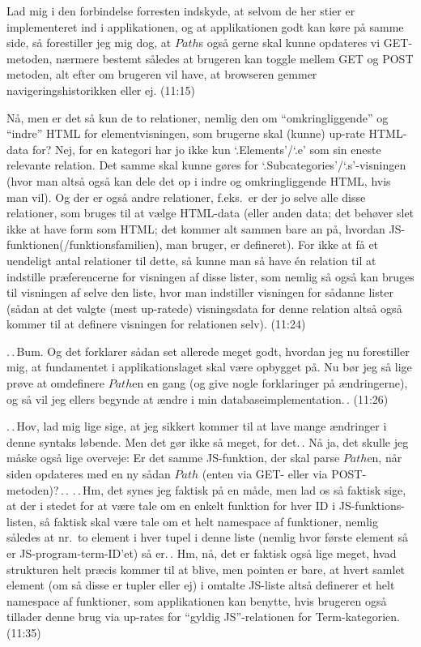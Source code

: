 \documentclass{report}
\begin{document}
Lad mig i den forbindelse forresten indskyde, at selvom de her stier er implementeret ind i applikationen, og at applikationen godt kan køre på samme side, så forestiller jeg mig dog, at $Path$s også gerne skal kunne opdateres vi GET-metoden, nærmere bestemt således at brugeren kan toggle mellem GET og POST metoden, alt efter om brugeren vil have, at browseren gemmer navigeringshistorikken eller ej. (11:15)

Nå, men er det så kun de to relationer, nemlig den om ``omkringliggende'' og ``indre'' HTML for elementvisningen, som brugerne skal (kunne) up-rate HTML-data for? Nej, for en kategori har jo ikke kun `.Elements'/`.e' som sin eneste relevante relation. Det samme skal kunne gøres for `.Subcategories'/`.s'-visningen (hvor man altså også kan dele det op i indre og omkringliggende HTML, hvis man vil). Og der er også andre relationer, f.eks.\ er der jo selve alle disse relationer, som bruges til at vælge HTML-data (eller anden data; det behøver slet ikke at have form som HTML; det kommer alt sammen bare an på, hvordan JS-funktionen(/funktionsfamilien), man bruger, er defineret). For ikke at få et uendeligt antal relationer til dette, så kunne man så have én relation til at indstille præferencerne for visningen af disse lister, som nemlig så også kan bruges til visningen af selve den liste, hvor man indstiller visningen for sådanne lister (sådan at det valgte (mest up-ratede) visningsdata for denne relation altså også kommer til at definere visningen for relationen selv). (11:24) 

.\,.\,Bum. Og det forklarer sådan set allerede meget godt, hvordan jeg nu forestiller mig, at fundamentet i applikationslaget skal være opbygget på. Nu bør jeg så lige prøve at omdefinere $Path$en en gang (og give nogle forklaringer på ændringerne), og så vil jeg ellers begynde at ændre i min databaseimplementation.\,. (11:26)

.\,.\,Hov, lad mig lige sige, at jeg sikkert kommer til at lave mange ændringer i denne syntaks løbende. Men det gør ikke så meget, for det.\,. Nå ja, det skulle jeg måske også lige overveje: Er det samme JS-funktion, der skal parse $Path$en, når siden opdateres med en ny sådan $Path$ (enten via GET- eller via POST-metoden)?\,.\,. .\,.\,Hm, det synes jeg faktisk på en måde, men lad os så faktisk sige, at der i stedet for at være tale om en enkelt funktion for hver ID i JS-funktions-listen, så faktisk skal være tale om et helt namespace af funktioner, nemlig således at nr.\ to element i hver tupel i denne liste (nemlig hvor første element så er JS-program-term-ID'et) så er.\,. Hm, nå, det er faktisk også lige meget, hvad strukturen helt præcis kommer til at blive, men pointen er bare, at hvert samlet element (om så disse er tupler eller ej) i omtalte JS-liste altså definerer et helt namespace af funktioner, som applikationen kan benytte, hvis brugeren også tillader denne brug via up-rates for ``gyldig JS''-relationen for Term-kategorien. (11:35)
\end{document}
